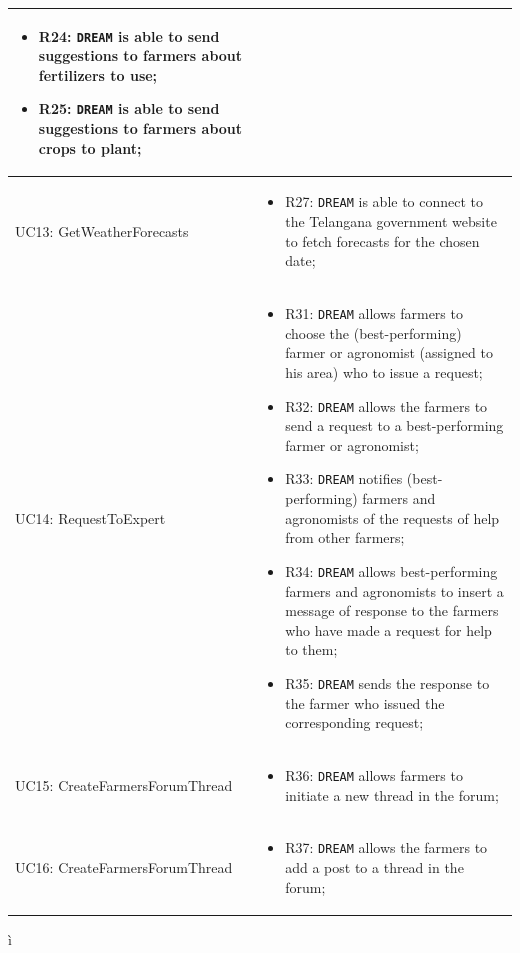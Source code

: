 \documentclass{article}
\begin{document}
\begin{longtable}[c]{|m{}|m{8cm}|}
\begin{itemize}
    \item R24: \verb|DREAM| is able to send suggestions to farmers about fertilizers to use;
    
    \item R25: \verb|DREAM| is able to send suggestions to farmers about crops to plant; 
\end{itemize} \\ \hline
UC13: GetWeatherForecasts &
\begin{itemize}
    \item R27: \verb|DREAM| is able to connect to the Telangana government website to fetch forecasts for the chosen date;
\end{itemize} \\ \hline
UC14: RequestToExpert &
\begin{itemize}
    \item R31: \verb|DREAM| allows farmers to choose the (best-performing) farmer or agronomist (assigned to his area) who to issue a request;
  
    \item R32: \verb|DREAM| allows the farmers to send a request to a best-performing farmer or agronomist;
    
    \item R33: \verb|DREAM| notifies (best-performing) farmers and agronomists of the requests of help from other farmers;

    \item R34: \verb|DREAM| allows best-performing farmers and agronomists to insert a message of response to the farmers who have made a request for help to them;

    \item R35: \verb|DREAM| sends the response to the farmer who issued the corresponding request;
\end{itemize} \\ \hline
UC15: CreateFarmersForumThread &
\begin{itemize}
    \item R36: \verb|DREAM| allows farmers to initiate a new thread in the forum;
\end{itemize} \\ \hline
UC16: CreateFarmersForumThread &
\begin{itemize}
    \item R37: \verb|DREAM| allows the farmers to add a post to a thread in the forum;
\end{itemize} \\ \hline
\end{longtable}
ì
\end{document}

